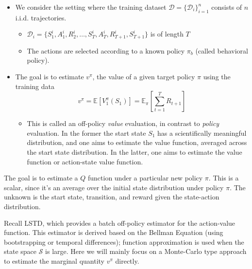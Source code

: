 \documentclass[11pt]{article}
\begin{document}
\begin{itemize}
\item We consider the setting where the training dataset $\mathcal{D} = \{ \mathcal{D}_i\}_{i=1}^n$ consists of  $n$ i.i.d. trajectories.  
  
  \begin{itemize}
  \item $\mathcal{D}_i = \{S_1^i, A_1^{i}, R_2^{i}, \dots, S_T^{i}, A_T^{i}, R_{T+1}^{i}, S_{T+1}^i\}$ is of length $T$
    
  \item The actions are selected according to a known policy $\pi_b$ (called behavioral policy).
    
  \end{itemize}
\item The goal is to estimate $v^\pi$, the value of a given target policy $\pi$ using the training data
  \[
    v^\pi = \mathbb{E}[V^\pi_1(S_1)] = \mathbb{E}_\pi\left[\sum_{t=1}^{T} R_{t+1}\right]
  \]
  \begin{itemize}
  \item This is called an off-policy \textit{value} evaluation, in contrast to \textit{policy} evaluation. In the former the start state $S_1$ has a scientifically meaningful distribution, and one aims to estimate the value function, averaged across the start state distribution. In the latter, one aims to estimate the value function or action-state value function.
  \end{itemize}
\end{itemize}

The goal is to estimate a $Q$ function under a particular new policy $\pi$. This is a scalar, since it's an average over the initial state distribution under policy $\pi$. The unknown is the start state, transition, and reward given the state-action distribution.

Recall LSTD, which provides a batch off-policy estimator for the action-value function. This estimator is derived based on the Bellman Equation (using bootstrapping or temporal differences); function approximation is used when the state space $\mathcal{S}$ is large. Here we will mainly focus on a Monte-Carlo type approach to estimate the marginal quantity $v^\pi$ directly.
\end{document}
